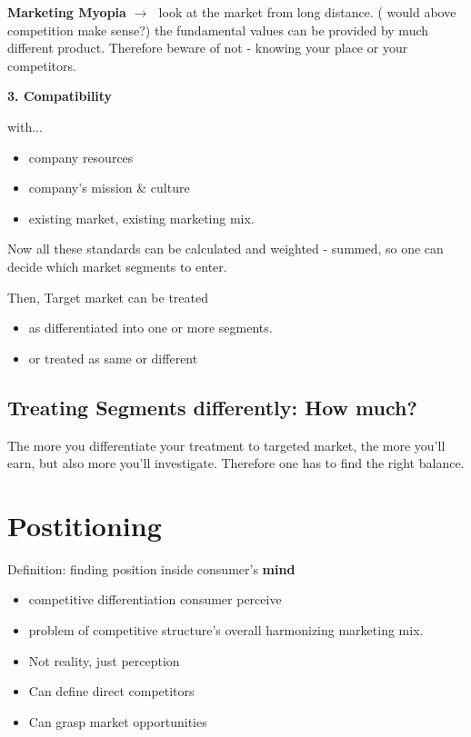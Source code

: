 \documentclass[12pt]{article}
\newcommand{\ra}{$\rightarrow \text{ }$}
\newcommand{\tb}{\textbf}
\begin{document}
\begin{center}
	{\Large \textbf{Marketing Myopia}}
	\ra look at the market from long distance. ( would above competition make sense?)
	the fundamental values can be provided by much different product. Therefore beware of not - knowing your place or your competitors.
\end{center}

\tb{3. Compatibility}

with...
\begin{itemize}
	\item company resources
	\item company's mission \& culture
	\item existing market, existing marketing mix.
\end{itemize}

Now all these standards can be calculated and weighted - summed, so one can decide which market segments to enter.

Then, Target market can be treated
\begin{itemize}
	\item as differentiated into one or more segments.
	\item or treated as same or different
\end{itemize}

\subsection{Treating Segments differently: How much?}
The more you differentiate your treatment to targeted market, the more you'll earn, but also more you'll investigate. Therefore one has to find the right balance.


\section{Postitioning}
Definition: finding position inside consumer's \textbf{mind}

\begin{itemize}
	\item competitive differentiation consumer perceive
	\item problem of competitive structure's overall harmonizing marketing mix.
	\item Not reality, just perception
	\item Can define direct competitors
	\item Can grasp market opportunities
\end{itemize}
\end{document}
